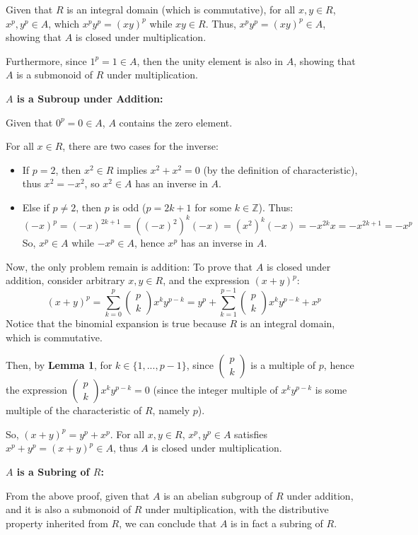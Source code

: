 \documentclass{article}
\begin{document}
Given that $R$ is an integral domain (which is commutative), for all $x,y\in R$, $x^p,y^p\in A$, which $x^py^p = (xy)^p$ while $xy\in R$.
Thus, $x^py^p = (xy)^p\in A$, showing that $A$ is closed under multiplication.

Furthermore, since $1^p=1\in A$, then the unity element is also in $A$, showing that $A$ is a submonoid of $R$ under multiplication.

\hfill

\textbf{$A$ is a Subroup under Addition:}

Given that $0^p = 0 \in A$, $A$ contains the zero element.

For all $x\in R$, there are two cases for the inverse:
\begin{itemize}
    \item If $p=2$, then $x^2\in R$ implies $x^2+x^2=0$ (by the definition of characteristic), thus $x^2=-x^2$, so $x^2\in A$ has an inverse in $A$.
    \item Else if $p\neq 2$, then $p$ is odd ($p=2k+1$ for some $k\in\mathbb{Z}$). Thus:
    $$(-x)^p = (-x)^{2k+1} = ((-x)^2)^k(-x) = (x^2)^k(-x) = -x^{2k}x = -x^{2k+1}=-x^p$$
    So, $x^p\in A$ while $-x^p\in A$, hence $x^p$ has an inverse in $A$.
\end{itemize}

Now, the only problem remain is addition: To prove that $A$ is closed under addition, consider arbitrary $x,y\in R$, and the expression $(x+y)^p$:
$$(x+y)^p = \sum_{k=0}^{p}\begin{pmatrix}
    p\\k
\end{pmatrix}x^ky^{p-k} = y^p + \sum_{k=1}^{p-1}\begin{pmatrix}
    p\\k
\end{pmatrix}x^ky^{p-k} + x^p$$
Notice that the binomial expansion is true because $R$ is an integral domain, which is commutative. 

Then, by \textbf{Lemma 1}, for $k\in\{1,...,p-1\}$, since $\begin{pmatrix}
    p\\k
\end{pmatrix}$ is a multiple of $p$, hence the expression $\begin{pmatrix}
    p\\k
\end{pmatrix}x^ky^{p-k}=0$ (since the integer multiple of $x^ky^{p-k}$ is some multiple of the characteristic of $R$, namely $p$).

So, $(x+y)^p = y^p + x^p$. For all $x,y\in R$, $x^p, y^p\in A$ satisfies $x^p+y^p = (x+y)^p \in A$, thus $A$ is closed under multiplication.

\hfill

\textbf{$A$ is a Subring of $R$:}

From the above proof, given that $A$ is an abelian subgroup of $R$ under addition, and it is also a submonoid of $R$ under multiplication,
with the distributive property inherited from $R$, we can conclude that $A$ is in fact a subring of $R$.
\end{document}
